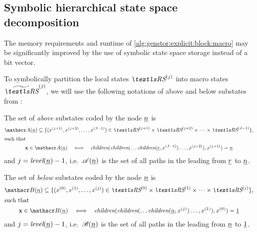 \subsection{Symbolic hierarchical state space decomposition}

The memory requirements and runtime of
\vref{alg:genstor:explicit:block:macro} may be significantly improved
by the use of symbolic state space storage instead of a bit vector.

To symbolically partition the local states $\loc{\RS}{j}$ into macro
states $\loc{\Macro{\RS}}{j}$, we will use the following notations of above and
below substates from \citet{ciardo2001saturation}:

\begin{dfn}
  The set of \emph{above} substates coded by the node $\underline{n}$ is
  \begin{gather}
    \mddAbove(\ddnode{n}) \subseteq \{ (\loc{x}{j + 1}, \loc{x}{j +
      2}, \ldots, \loc{x}{J - 1}) \in \loc{\RS}{j + 1} \times
    \loc{\RS}{j +
      2} \times \cdots \times \loc{\RS}{J - 1} \} \text, \\
    \intertext{such that}
    \vec{x} \in \mddAbove(\ddnode{n})
    \quad\Longleftrightarrow\quad \mddChildren(\mddChildren(\ldots
    \mddChildren(\ddnode{r}, \loc{x}{J - 1}) \ldots ,\loc{x}{j + 2}),
    \loc{x}{j + 1}) = \ddnode{n}
  \end{gather}
  and $j = \textit{level}(\underline{n}) - 1$, i.e.~$\mathscr{A}(\underline{n})$ is
  the set of all paths in the  leading from $\underline{r}$
  to $\underline{n}$.
\end{dfn}

\begin{dfn}
  The set of \emph{below} substates coded by the node $\underline{n}$ is
  \begin{gather}
    \mddBelow(\ddnode{n}) \subseteq \{ (\loc{x}{0}, \loc{x}{1},
    \ldots, \loc{x}{j}) \in \loc{\RS}{0} \times
    \loc{\RS}{1} \times \cdots \times \loc{\RS}{j} \} \text, \\
    \intertext{such that}
    \vec{x} \in \mddBelow(\ddnode{n})
    \quad\Longleftrightarrow\quad \mddChildren(\mddChildren(\ldots
    \mddChildren(\ddnode{n}, \loc{x}{j}) \ldots ,\loc{x}{1}),
    \loc{x}{0}) = \ddnode{1}
  \end{gather}
  and $j = \textit{level}(\underline{n}) - 1$, i.e.~$\mathscr{B}(\underline{n})$ is
  the set of all paths in the  leading from $\underline{n}$
  to $\underline{1}$.
\end{dfn}

